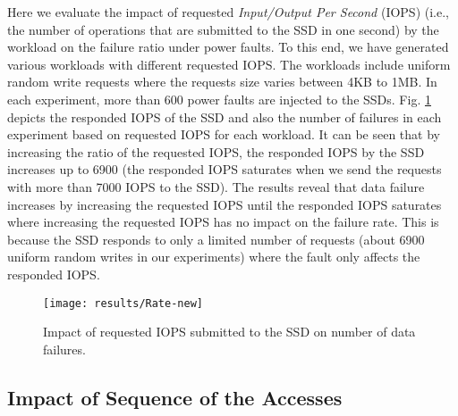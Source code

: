 Here we evaluate the impact of requested \emph{Input/Output Per Second} (IOPS) (i.e., the number of operations that are submitted to the SSD in one second) by the workload on the failure ratio under power faults.
To this end, we have generated various workloads with different requested IOPS. The workloads include uniform random write requests where the requests size varies between 4KB to 1MB. In each experiment, more than 600 power faults are injected to the SSDs. Fig. \ref{req_rate} depicts the responded IOPS of the SSD and also the number of failures in each experiment based on requested IOPS for each workload. It can be seen that by increasing the ratio of the requested IOPS, the responded IOPS by the SSD increases up to 6900 (the responded IOPS saturates when we send the requests with more than 7000 IOPS to the SSD). The results reveal that data failure increases by increasing the requested IOPS until the responded IOPS saturates where increasing the requested IOPS has no impact on the failure rate. This is because the SSD responds to only a limited number of requests (about 6900 uniform random writes in our experiments) where the fault only affects the responded IOPS.

\begin{figure}[t]
	\centering
	\texttt{[image: results/Rate-new]}
	\vspace{-0.5em}
	\caption{Impact of requested IOPS submitted to the SSD on number of data failures.}
	\vspace{-2em}
	\label{req_rate}
\end{figure}

\vspace{-1em}
\subsection{Impact of Sequence of the Accesses}
\vspace{-0.7em}
\label{sec:req_seq}

